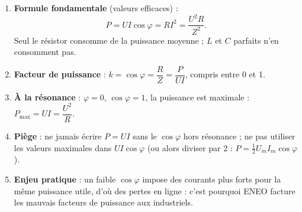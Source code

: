 \documentclass[11pt]{article}
\begin{document}
\begin{methode}
\begin{enumerate}
\item \textbf{Formule fondamentale} (valeurs efficaces) :
\[ P = UI\cos\varphi = RI^{2} = \dfrac{U^{2}R}{Z^{2}}. \]
Seul le résistor consomme de la puissance moyenne ; $L$ et $C$ parfaits n'en consomment pas.
\item \textbf{Facteur de puissance} : $k = \cos\varphi = \dfrac{R}{Z} = \dfrac{P}{UI}$, compris entre 0 et 1.
\item \textbf{À la résonance} : $\varphi = 0$, $\cos\varphi = 1$, la puissance est maximale : $P_{\max} = UI = \dfrac{U^{2}}{R}$.
\item \textbf{Piège} : ne jamais écrire $P = UI$ sans le $\cos\varphi$ hors résonance ; ne pas utiliser les valeurs maximales dans $UI\cos\varphi$ (ou alors diviser par 2 : $P = \tfrac{1}{2}U_m I_m \cos\varphi$).
\item \textbf{Enjeu pratique} : un faible $\cos\varphi$ impose des courants plus forts pour la même puissance utile, d'où des pertes en ligne : c'est pourquoi ENEO facture les mauvais facteurs de puissance aux industriels.
\end{enumerate}
\end{methode}
\end{document}
